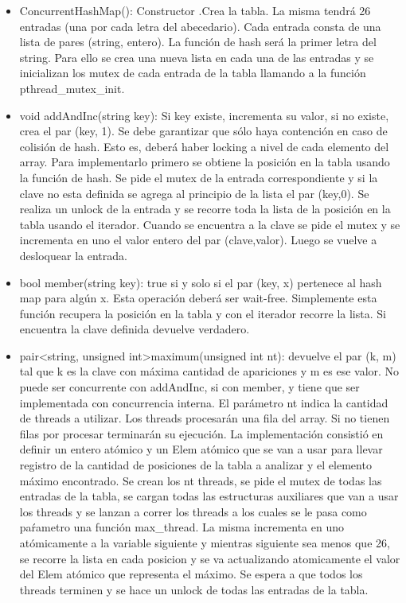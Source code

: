 \documentclass[a4paper]{article}
\begin{document}
{\begin{itemize}

\item ConcurrentHashMap(): Constructor .Crea la tabla. La misma tendrá 26 entradas (una por
cada letra del abecedario). Cada entrada consta de una lista de pares (string, entero). La
función de hash será la primer letra del string. Para ello se crea una nueva lista en cada una de las entradas y se inicializan los mutex de cada entrada de la tabla llamando a la función pthread_mutex_init.\blindtext
\item void addAndInc(string key): Si key existe, incrementa su valor, si no existe, crea el par
(key, 1). Se debe garantizar que sólo haya contención en caso de colisión de hash. Esto es,
deberá haber locking a nivel de cada elemento del array. Para implementarlo primero se obtiene la posición en la tabla usando la función de hash. Se pide el mutex de la entrada correspondiente y si la clave no esta definida se agrega al principio de la lista el par (key,0). Se realiza un unlock de la entrada y se recorre toda la lista de la posición en la tabla usando el iterador. Cuando se encuentra a la clave se pide el mutex y se incrementa en uno el valor entero del par (clave,valor). Luego se vuelve a desloquear la entrada.\blindtext
\item bool member(string key): true si y solo si el par (key, x) pertenece al hash map para algún
x. Esta operación deberá ser wait-free. Simplemente esta función recupera la posición en la tabla y con el iterador recorre la lista. Si encuentra la clave definida devuelve verdadero. 
\item pair<string, unsigned int>maximum(unsigned int nt): devuelve el par (k, m) tal que
k es la clave con máxima cantidad de apariciones y m es ese valor. No puede ser concurrente
con addAndInc, si con member, y tiene que ser implementada con concurrencia interna. El
parámetro nt indica la cantidad de threads a utilizar. Los threads procesarán una fila del
array. Si no tienen filas por procesar terminarán su ejecución. La implementación consistió en definir un entero atómico y un Elem atómico que se van a usar para llevar registro de la cantidad de posiciones de la tabla a analizar y el elemento máximo encontrado. Se crean los nt threads, se pide el mutex de todas las entradas de la tabla, se cargan todas las estructuras auxiliares que van a usar los threads y se lanzan a correr los threads a los cuales se le pasa como paŕametro una función max_thread. La misma incrementa en uno atómicamente a la variable siguiente y mientras siguiente sea menos que 26, se recorre la lista en cada posicion y se va actualizando atomicamente el valor del Elem atómico que representa el máximo. Se espera a que todos los threads terminen y se hace un unlock de todas las entradas de la tabla.


\end{itemize}}
\end{document}

